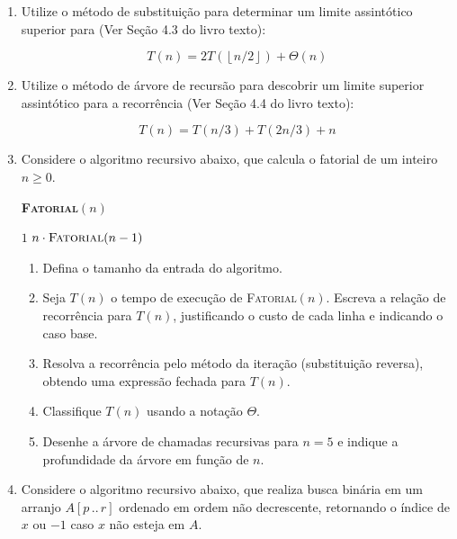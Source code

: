 \documentclass[9pt,a4paper]{extarticle}
\begin{document}
\begin{enumerate}[resume]
    \item Utilize o método de substituição para determinar um limite assintótico superior para (Ver Seção 4.3 do livro texto):
    
    \[
    T(n) = 2T(\left\lfloor n/2 \right\rfloor) + \Theta(n)
    \]
    
    \item Utilize o método de árvore de recursão para descobrir um limite superior assintótico para a recorrência (Ver Seção 4.4 do livro texto):
    
    \[
    T(n) = T(n/3) + T(2n/3) + n
    \]


    \item Considere o algoritmo recursivo abaixo, que calcula o fatorial de um inteiro $n \geq 0$.

    \begin{center}
    \begin{minipage}{0.55\textwidth}
    \textbf{\textsc{Fatorial}}$(n)$
    \begin{algorithmic}[1]
            \State \Return $1$
        \EndIf
        \State \Return $n \cdot \textsc{Fatorial}(n - 1)$
    \end{algorithmic}
    \end{minipage}
    \end{center}

    \begin{enumerate}
        \item Defina o tamanho da entrada do algoritmo.
        \item Seja $T(n)$ o tempo de execução de \textsc{Fatorial}$(n)$. Escreva a relação de recorrência para $T(n)$, justificando o custo de cada linha e indicando o caso base.
        \item Resolva a recorrência pelo método da iteração (substituição reversa), obtendo uma expressão fechada para $T(n)$.
        \item Classifique $T(n)$ usando a notação $\Theta$.
        \item Desenhe a árvore de chamadas recursivas para $n = 5$ e indique a profundidade da árvore em função de $n$.
    \end{enumerate}



    \item Considere o algoritmo recursivo abaixo, que realiza busca binária em um arranjo $A[p\,..\,r]$ ordenado em ordem não decrescente, retornando o índice de $x$ ou $-1$ caso $x$ não esteja em $A$.


\end{enumerate}
\end{document}
